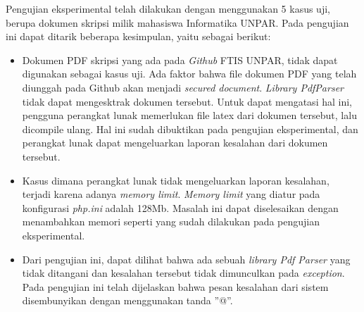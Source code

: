 Pengujian eksperimental telah dilakukan dengan menggunakan 5 kasus uji, berupa dokumen skripsi milik mahasiswa Informatika UNPAR. Pada pengujian ini dapat ditarik beberapa kesimpulan, yaitu sebagai berikut:

\begin{itemize}
	\item Dokumen PDF skripsi yang ada pada \textit{Github} FTIS UNPAR, tidak dapat digunakan sebagai kasus uji. Ada faktor bahwa file dokumen PDF yang telah diunggah pada Github akan menjadi \textit{secured document}. \textit{Library PdfParser} tidak dapat mengesktrak dokumen tersebut. Untuk dapat mengatasi hal ini, pengguna perangkat lunak memerlukan file latex dari dokumen tersebut, lalu dicompile ulang. Hal ini sudah dibuktikan pada pengujian eksperimental, dan perangkat lunak dapat mengeluarkan laporan kesalahan dari dokumen tersebut.
	
	\item Kasus dimana perangkat lunak tidak mengeluarkan laporan kesalahan, terjadi karena adanya \textit{memory limit}. \textit{Memory limit} yang diatur pada konfigurasi \textit{php.ini} adalah 128Mb. Masalah ini dapat diselesaikan dengan menambahkan memori seperti yang sudah dilakukan pada pengujian eksperimental.
	
	\item Dari pengujian ini, dapat dilihat bahwa ada sebuah \textit{library Pdf Parser} yang tidak ditangani dan kesalahan tersebut tidak dimunculkan pada \textit{exception}. Pada pengujian ini telah dijelaskan bahwa pesan kesalahan dari sistem disembunyikan dengan menggunakan tanda ''@''.
\end{itemize}